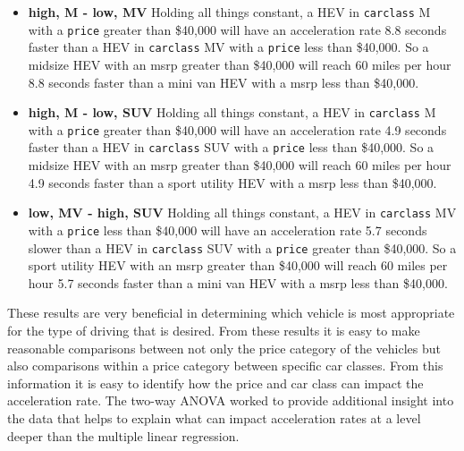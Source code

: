 \documentclass[acmsmall]{acmart}
\begin{document}
\begin{itemize}
\item[] \textbf{high, M - low, MV} Holding all things constant, a HEV in \texttt{carclass} M with a \texttt{price} greater than \$40,000 will have an acceleration rate 8.8 seconds faster than a HEV in \texttt{carclass} MV with a \texttt{price} less than \$40,000. So a midsize HEV with an msrp greater than \$40,000 will reach 60 miles per hour 8.8 seconds faster than a mini van HEV with a msrp less than \$40,000.
\item[] \textbf{high, M - low, SUV} Holding all things constant, a HEV in \texttt{carclass} M with a \texttt{price} greater than \$40,000 will have an acceleration rate 4.9 seconds faster than a HEV in \texttt{carclass} SUV with a \texttt{price} less than \$40,000. So a midsize HEV with an msrp greater than \$40,000 will reach 60 miles per hour 4.9 seconds faster than a sport utility HEV with a msrp less than \$40,000.
\item[] \textbf{low, MV - high, SUV} Holding all things constant, a HEV in \texttt{carclass} MV with a \texttt{price} less than \$40,000 will have an acceleration rate 5.7 seconds slower than a HEV in \texttt{carclass} SUV with a \texttt{price} greater than \$40,000. So a sport utility HEV with an msrp greater than \$40,000 will reach 60 miles per hour 5.7 seconds faster than a mini van HEV with a msrp less than \$40,000.
\end{itemize}
These results are very beneficial in determining which vehicle is most appropriate for the type of driving that is desired. From these results it is easy to make reasonable comparisons between not only the price category of the vehicles but also comparisons within a price category between specific car classes. From this information it is easy to identify how the price and car class can impact the acceleration rate. The two-way ANOVA worked to provide additional insight into the data that helps to explain what can impact acceleration rates at a level deeper than the multiple linear regression.

\pagebreak
\appendix{} 
\end{document}
